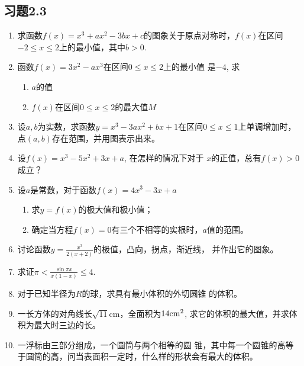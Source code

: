     \subsection*{习题2.3}
    \begin{enumerate}
        \item 求函数$f(x)=x^3+ax^2-3bx+c$的图象关于原点对称时，$f(x)$在区间$-2\le x\le 2$上的最小值，其中$b>0$.
        
        \item 函数$f(x)=3x^2-ax^3$在区间$0\le x\le 2$上的最小值
        是$-4$, 求
    \begin{enumerate}
        \item $a$的值
        \item $f(x)$在区间$0\le x\le 2$的最大值$M$
    \end{enumerate}
    \item 设$a,b$为实数，求函数$y=x^3-3ax^2+bx+1$在区间$0\le x\le 1$上单调增加时，点$(a,b)$存在范围，并用图表示出来。
    
    \item 设$f(x)=x^3-5x^2+3x+a$, 在怎样的情况下对于
    $x$的正值，总有$f(x)>0$成立？
    \item 设$a$是常数，对于函数$f(x)=4x^3-3x+a$
    \begin{enumerate}
        \item 求$y=f(x)$的极大值和极小值；
        \item 确定当方程$f(x)=0$有三个不相等的实根时，$a$值的范围。
    \end{enumerate}
    
    \item 讨论函数$y=\frac{x^3}{2 (x+2)}$的极值，凸向，拐点，渐近线，
    并作出它的图象。
    
    \item 求证$\pi<\frac{\sin\pi x}{x(1-x)}\le 4$.
    \item 对于已知半径为$R$的球，求具有最小体积的外切圆锥
    的体积。
    \item 一长方体的对角线长$\sqrt{11}$cm，全面积为$14{\rm cm}^2$, 求它的体积的最大值，并求体积为最大时三边的长。
    \item 一浮标由三部分组成，一个圆筒与两个相等的圆
    锥，其中每一个圆锥的高等于圆筒的高，问当表面积一定时，什么样的形状会有最大的体积。
    \end{enumerate}     
    
    
    